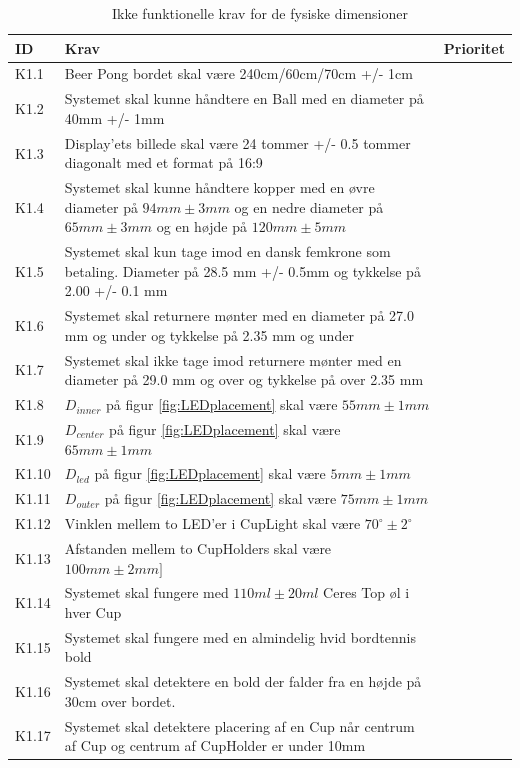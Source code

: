 \documentclass[Kravspecifikation/Kravspec_Main.tex]{subfiles}
\begin{document}
\begin{table}[H]
\centering
\begin{tabular}{|L{0.1\textwidth}|L{0.6\textwidth}|L{0.15\textwidth}|}
\hline
\textbf{ID} & \textbf{Krav} & \textbf{Prioritet} \\ \hline
K1.1 & Beer Pong bordet skal være 240cm/60cm/70cm +/- 1cm  &  \\ \hline
K1.2 & Systemet skal kunne håndtere en Ball med en diameter på 40mm +/- 1mm&  \\ \hline
K1.3 & Display'ets billede skal være 24 tommer +/- 0.5 tommer diagonalt med et format på 16:9&  \\ \hline
K1.4 & Systemet skal kunne håndtere kopper med en øvre diameter på $94\si{mm} \pm 3\si{mm}$ og en nedre diameter på $65\si{mm} \pm 3\si{mm}$  og en højde på $120mm \pm{5mm}$ & \\ \hline
K1.5 & Systemet skal kun tage imod en dansk femkrone som betaling. Diameter på 28.5 mm +/- 0.5mm og tykkelse på 2.00 +/- 0.1 mm & \\ \hline
K1.6 & Systemet skal returnere mønter med en diameter på 27.0 mm og under og tykkelse på 2.35 mm og under & \\ \hline
K1.7 & Systemet skal ikke tage imod returnere mønter med en diameter på 29.0 mm og over og tykkelse på over 2.35 mm& \\ \hline
K1.8 & $D_{inner}$ på figur \ref{fig:LEDplacement} skal være $55\si{mm} \pm 1\si{mm}$  & \\ \hline
K1.9 & $D_{center}$ på figur \ref{fig:LEDplacement} skal være $65\si{mm} \pm 1\si{mm}$  & \\ \hline
K1.10 & $D_{led}$ på figur \ref{fig:LEDplacement} skal være $5\si{mm} \pm 1\si{mm}$  & \\ \hline
K1.11 & $D_{outer}$ på figur \ref{fig:LEDplacement} skal være $75\si{mm} \pm 1\si{mm}$   & \\ \hline
K1.12 & Vinklen mellem to LED'er i CupLight skal være $70^{\circ} \pm 2^{\circ}$ & \\ \hline
K1.13 & Afstanden mellem to CupHolders skal være $100\si{mm} \pm 2\si{mm}]$ & \\ \hline
K1.14 & Systemet skal fungere med $110\si{ml} \pm 20\si{ml}$ Ceres Top øl i hver Cup & \\ \hline
K1.15 & Systemet skal fungere med en almindelig hvid bordtennis bold & \\ \hline
K1.16 & Systemet skal detektere en bold der falder fra en højde på 30cm over bordet. & \\ \hline 
K1.17 & Systemet skal detektere placering af en Cup når centrum af Cup og centrum af CupHolder er under 10mm & \\ \hline

\end{tabular}
\caption{Ikke funktionelle krav for de fysiske dimensioner}
\label{tab:fysiske_dimensioner}
\end{table}
\end{document}
